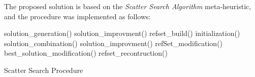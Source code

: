 The proposed solution is based on the \emph{Scatter Search Algorithm} meta-heuristic,
and the procedure was implemented as follows:

\begin{scriptsize}
\begin{algorithm}
    \begin{algorithmic}
        \STATE solution\_generation()
        \STATE solution\_improvment()
        \STATE refset\_build()
        \STATE initialization()
        \REPEAT
                \STATE solution\_combination()
                \STATE solution\_improvment()
                \STATE refSet\_modification()
            \ENDWHILE
            \STATE best\_solution\_modification()
            \STATE refset\_recontruction()
    \end{algorithmic}
    \caption{Scatter Search Procedure}
\end{algorithm}
\end{scriptsize}
